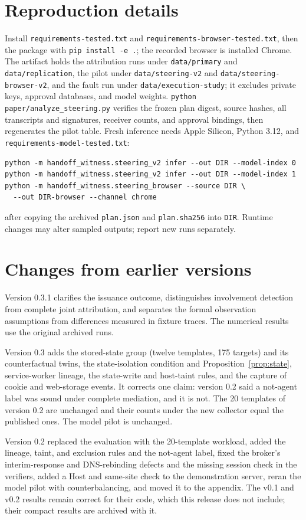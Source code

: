 \documentclass[11pt]{article}
\theoremstyle{definition}
\begin{document}
\section{Reproduction details}
Install \texttt{requirements-tested.txt} and \texttt{requirements-browser-tested.txt},
then the package with \texttt{pip install -e .}; the recorded browser is installed
Chrome. The artifact holds the attribution runs under \texttt{data/primary} and
\texttt{data/replication}, the pilot under \texttt{data/steering-v2} and
\texttt{data/steering-browser-v2}, and the fault run under
\texttt{data/execution-study}; it excludes private keys, approval databases, and
model weights. \texttt{python paper/analyze\_steering.py} verifies the frozen plan
digest, source hashes, all transcripts and signatures, receiver counts, and
approval bindings, then regenerates the pilot table. Fresh inference needs Apple
Silicon, Python 3.12, and \texttt{requirements-model-tested.txt}:
\begin{verbatim}
python -m handoff_witness.steering_v2 infer --out DIR --model-index 0
python -m handoff_witness.steering_v2 infer --out DIR --model-index 1
python -m handoff_witness.steering_browser --source DIR \
  --out DIR-browser --channel chrome
\end{verbatim}
after copying the archived \texttt{plan.json} and \texttt{plan.sha256} into
\texttt{DIR}. Runtime changes may alter sampled outputs; report new runs
separately.

\section{Changes from earlier versions}
Version 0.3.1 clarifies the issuance outcome, distinguishes involvement detection from
complete joint attribution, and separates the formal observation assumptions from
differences measured in fixture traces. The numerical results use the original archived
runs.

Version 0.3 adds the stored-state group (twelve templates, 175 targets) and its
counterfactual twins, the state-isolation condition and
Proposition~\ref{prop:state}, service-worker lineage, the state-write and
host-taint rules, and the capture of cookie and web-storage events. It corrects
one claim: version 0.2 said a not-agent label was sound under complete
mediation, and it is not. The 20 templates of version 0.2 are unchanged and
their counts under the new collector equal the published ones. The model pilot
is unchanged.

Version 0.2 replaced the evaluation with the 20-template workload, added the
lineage, taint, and exclusion rules and the not-agent label, fixed the broker's
interim-response and DNS-rebinding defects and the missing session check in the
verifiers, added a Host and same-site check to the demonstration server, reran
the model pilot with counterbalancing, and moved it to the appendix. The v0.1
and v0.2 results remain correct for their code, which this release does not
include; their compact results are archived with it.

\begingroup\raggedright


\endgroup
\end{document}
